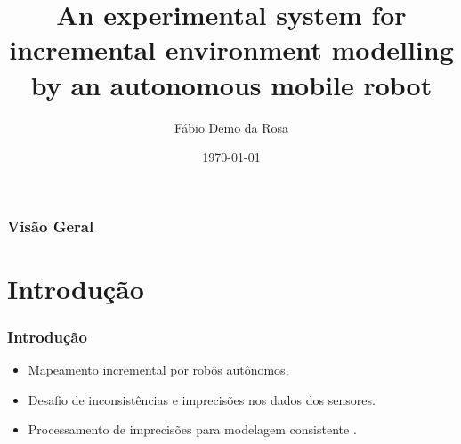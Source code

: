 \documentclass[xcolor=dvipsnames, aspectratio=169]{beamer}
\title[An experimental system for incremental environment modelling by an autonomous mobile robot]{An experimental system for incremental environment modelling by an autonomous mobile robot} %
\author[FDR]{Fábio Demo da Rosa} %
\institute[UFSM] %
{
Universidade Federal de Santa Maria \\ %
Pós-Graduação em Ciência da Computação \\
Disciplina de Robótica Móvel\\
\medskip
\textit{faberdemo@gmail.com} %
}
\date{\today} %
\begin{document}
\begin{frame}
\titlepage %
\end{frame}

\begin{frame}
\frametitle{Visão Geral} %
\tableofcontents %
\end{frame}


\section{Introdução}
\begin{frame}[fragile]
  \frametitle{Introdução}
  \begin{itemize}
    \item Mapeamento incremental por robôs autônomos.
    \item Desafio de inconsistências e imprecisões nos dados dos sensores.
    \item Processamento de imprecisões para modelagem consistente \cite{moutarlier2006experimental}.
  \end{itemize}
\end{frame}

\end{document}
